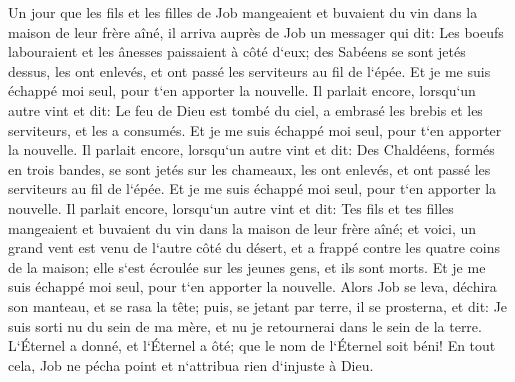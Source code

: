 \verse Un jour que les fils et les filles de Job mangeaient et buvaient du vin dans la maison de leur frère aîné, 
\verse il arriva auprès de Job un messager qui dit: Les boeufs labouraient et les ânesses paissaient à côté d`eux; 
\verse des Sabéens se sont jetés dessus, les ont enlevés, et ont passé les serviteurs au fil de l`épée. Et je me suis échappé moi seul, pour t`en apporter la nouvelle. 
\verse Il parlait encore, lorsqu`un autre vint et dit: Le feu de Dieu est tombé du ciel, a embrasé les brebis et les serviteurs, et les a consumés. Et je me suis échappé moi seul, pour t`en apporter la nouvelle. 
\verse Il parlait encore, lorsqu`un autre vint et dit: Des Chaldéens, formés en trois bandes, se sont jetés sur les chameaux, les ont enlevés, et ont passé les serviteurs au fil de l`épée. Et je me suis échappé moi seul, pour t`en apporter la nouvelle. 
\verse Il parlait encore, lorsqu`un autre vint et dit: Tes fils et tes filles mangeaient et buvaient du vin dans la maison de leur frère aîné; 
\verse et voici, un grand vent est venu de l`autre côté du désert, et a frappé contre les quatre coins de la maison; elle s`est écroulée sur les jeunes gens, et ils sont morts. Et je me suis échappé moi seul, pour t`en apporter la nouvelle. 
\verse Alors Job se leva, déchira son manteau, et se rasa la tête; puis, se jetant par terre, il se prosterna, 
\verse et dit: Je suis sorti nu du sein de ma mère, et nu je retournerai dans le sein de la terre. L`Éternel a donné, et l`Éternel a ôté; que le nom de l`Éternel soit béni! 
\verse En tout cela, Job ne pécha point et n`attribua rien d`injuste à Dieu. 

